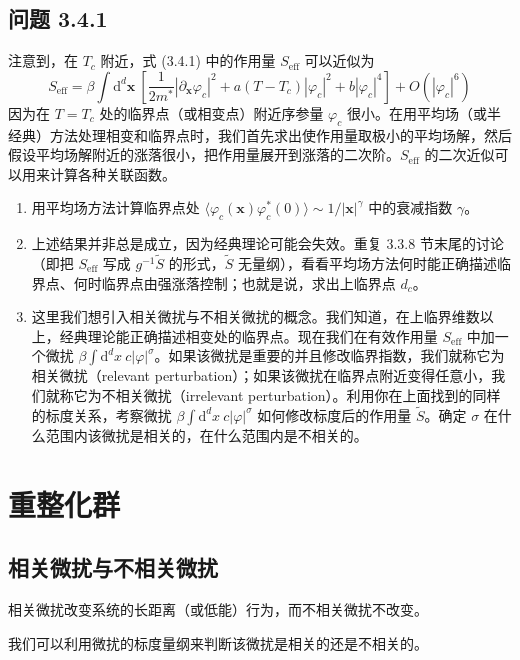 \subsection*{问题 3.4.1}
注意到，在 $T_{c}$ 附近，式 (3.4.1) 中的作用量 $S_{\mathrm{eff}}$ 可以近似为
\begin{equation*}
S_{\mathrm{eff}} = \beta\int \mathrm{d}^{d}\pmb{x}\ \left[ \frac{1}{2m^{*}}|\partial_{\pmb{x}}\varphi_{c}|^{2} + a(T-T_{c})|\varphi_{c}|^{2} + b|\varphi_{c}|^{4} \right] + O(|\varphi_{c}|^{6})
\end{equation*}
因为在 $T = T_{c}$ 处的临界点（或相变点）附近序参量 $\varphi_{c}$ 很小。在用平均场（或半经典）方法处理相变和临界点时，我们首先求出使作用量取极小的平均场解，然后假设平均场解附近的涨落很小，把作用量展开到涨落的二次阶。$S_{\mathrm{eff}}$ 的二次近似可以用来计算各种关联函数。

\begin{enumerate}
\item 用平均场方法计算临界点处 $\langle \varphi_{c}(\pmb{x})\varphi_{c}^{*}(0)\rangle \sim 1/|\pmb{x}|^{\gamma}$ 中的衰减指数 $\gamma$。
\item 上述结果并非总是成立，因为经典理论可能会失效。重复 3.3.8 节末尾的讨论（即把 $S_{\mathrm{eff}}$ 写成 $g^{-1}\tilde{S}$ 的形式，$\tilde{S}$ 无量纲），看看平均场方法何时能正确描述临界点、何时临界点由强涨落控制；也就是说，求出上临界点 $d_{c}$。
\item 这里我们想引入相关微扰与不相关微扰的概念。我们知道，在上临界维数以上，经典理论能正确描述相变处的临界点。现在我们在有效作用量 $S_{\mathrm{eff}}$ 中加一个微扰 $\beta\int \mathrm{d}^{d}x\ c|\varphi|^{\sigma}$。如果该微扰是重要的并且修改临界指数，我们就称它为相关微扰（relevant perturbation）；如果该微扰在临界点附近变得任意小，我们就称它为不相关微扰（irrelevant perturbation）。利用你在上面找到的同样的标度关系，考察微扰 $\beta\int \mathrm{d}^{d}x\ c|\varphi|^{\sigma}$ 如何修改标度后的作用量 $\tilde{S}$。确定 $\sigma$ 在什么范围内该微扰是相关的，在什么范围内是不相关的。
\end{enumerate}

\section{重整化群}

\subsection{相关微扰与不相关微扰}
\begin{keypoints}
\item 相关微扰改变系统的长距离（或低能）行为，而不相关微扰不改变。
\item 我们可以利用微扰的标度量纲来判断该微扰是相关的还是不相关的。
\end{keypoints}

